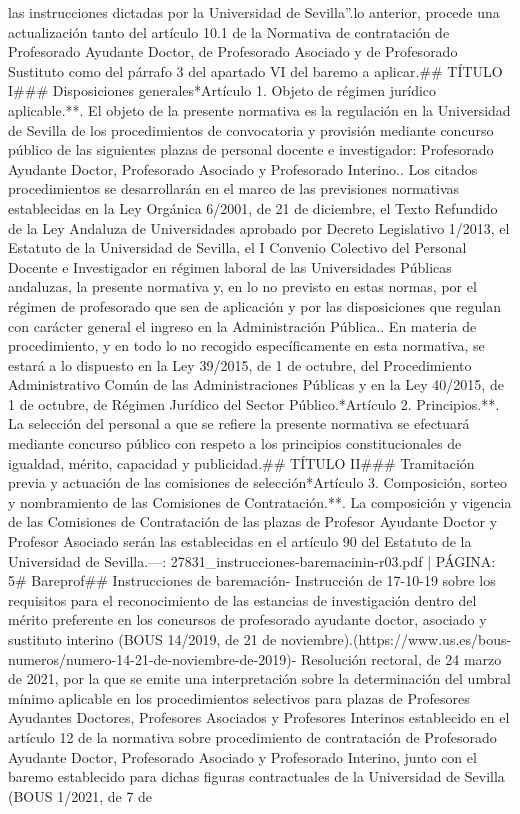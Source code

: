 \documentclass{article}
\begin{document}
\begin{itemize}
{{{{{{{{las instrucciones dictadas por la Universidad de Sevilla”.\n\nVisto lo anterior, procede una actualización tanto del artículo 10.1 de la Normativa de contratación de Profesorado Ayudante Doctor, de Profesorado Asociado y de Profesorado Sustituto como del párrafo 3 del apartado VI del baremo a aplicar.\n\n## TÍTULO I\n\n### Disposiciones generales\n\n**Artículo 1. Objeto de régimen jurídico aplicable.**\n{}. El objeto de la presente normativa es la regulación en la Universidad de Sevilla de los procedimientos de convocatoria y provisión mediante concurso público de las siguientes plazas de personal docente e investigador: Profesorado Ayudante Doctor, Profesorado Asociado y Profesorado Interino.. Los citados procedimientos se desarrollarán en el marco de las previsiones normativas establecidas en la Ley Orgánica 6/2001, de 21 de diciembre, el Texto Refundido de la Ley Andaluza de Universidades aprobado por Decreto Legislativo 1/2013, el Estatuto de la Universidad de Sevilla, el I Convenio Colectivo del Personal Docente e Investigador en régimen laboral de las Universidades Públicas andaluzas, la presente normativa y, en lo no previsto en estas normas, por el régimen de profesorado que sea de aplicación y por las disposiciones que regulan con carácter general el ingreso en la Administración Pública.. En materia de procedimiento, y en todo lo no recogido específicamente en esta normativa, se estará a lo dispuesto en la Ley 39/2015, de 1 de octubre, del Procedimiento Administrativo Común de las Administraciones Públicas y en la Ley 40/2015, de 1 de octubre, de Régimen Jurídico del Sector Público.\n\n**Artículo 2. Principios.**\n{}. La selección del personal a que se refiere la presente normativa se efectuará mediante concurso público con respeto a los principios constitucionales de igualdad, mérito, capacidad y publicidad.\n\n## TÍTULO II\n\n### Tramitación previa y actuación de las comisiones de selección\n\n**Artículo 3. Composición, sorteo y nombramiento de las Comisiones de Contratación.**\n{}. La composición y vigencia de las Comisiones de Contratación de las plazas de Profesor Ayudante Doctor y Profesor Asociado serán las establecidas en el artículo 90 del Estatuto de la Universidad de Sevilla.\n\n---\n\nFUENTE: 27831_instrucciones-baremacinin-r03.pdf | PÁGINA: 5\n# Bareprof\n\n## Instrucciones de baremación\n\n- Instrucción de 17-10-19 sobre los requisitos para el reconocimiento de las estancias de investigación dentro del mérito preferente en los concursos de profesorado ayudante doctor, asociado y sustituto interino (BOUS 14/2019, de 21 de noviembre).(https://www.us.es/bous-numeros/numero-14-21-de-noviembre-de-2019)\n\n- Resolución rectoral, de 24 marzo de 2021, por la que se emite una interpretación sobre la determinación del umbral mínimo aplicable en los procedimientos selectivos para plazas de Profesores Ayudantes Doctores, Profesores Asociados y Profesores Interinos establecido en el artículo 12 de la normativa sobre procedimiento de contratación de Profesorado Ayudante Doctor, Profesorado Asociado y Profesorado Interino, junto con el baremo establecido para dichas figuras contractuales de la Universidad de Sevilla (BOUS 1/2021, de 7 de }}}}}}}}
\end{itemize}
\end{document}
